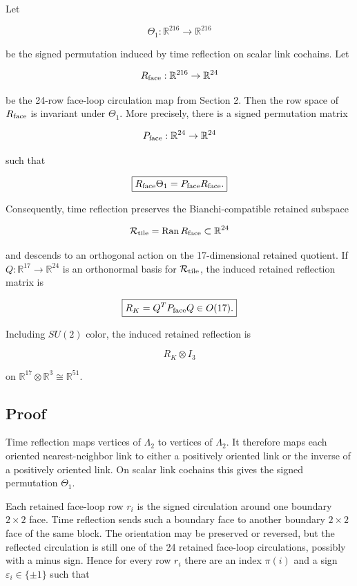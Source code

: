 \documentclass[10pt]{article}
\begin{document}
Let

\[
\Theta_1:\mathbb R^{216}\to\mathbb R^{216}
\]

be the signed permutation induced by time reflection on scalar link cochains.  Let

\[
R_{\rm face}:\mathbb R^{216}\to\mathbb R^{24}
\]

be the 24-row face-loop circulation map from Section 2.  Then the row space of \(R_{\rm face}\) is invariant under \(\Theta_1\).  More precisely, there is a signed permutation matrix

\[
P_{\rm face}:\mathbb R^{24}\to\mathbb R^{24}
\]

such that

\[
\boxed{
R_{\rm face}\Theta_1=P_{\rm face}R_{\rm face}.
}
\]

Consequently, time reflection preserves the Bianchi-compatible retained subspace

\[
\mathcal R_{\rm tile}=\operatorname{Ran}R_{\rm face}\subset\mathbb R^{24}
\]

and descends to an orthogonal action on the 17-dimensional retained quotient.  If \(Q:\mathbb R^{17}\to\mathbb R^{24}\) is an orthonormal basis for \(\mathcal R_{\rm tile}\), the induced retained reflection matrix is

\[
\boxed{
R_K=Q^TP_{\rm face}Q\in O(17).
}
\]

Including \(SU(2)\) color, the induced retained reflection is

\[
R_K\otimes I_3
\]

on \(\mathbb R^{17}\otimes\mathbb R^3\cong\mathbb R^{51}\).

\subsection{Proof}

Time reflection maps vertices of \(\Lambda_2\) to vertices of \(\Lambda_2\).  It therefore maps each oriented nearest-neighbor link to either a positively oriented link or the inverse of a positively oriented link.  On scalar link cochains this gives the signed permutation \(\Theta_1\).

Each retained face-loop row \(r_i\) is the signed circulation around one boundary \(2\times2\) face.  Time reflection sends such a boundary face to another boundary \(2\times2\) face of the same block.  The orientation may be preserved or reversed, but the reflected circulation is still one of the 24 retained face-loop circulations, possibly with a minus sign.  Hence for every row \(r_i\) there are an index \(\pi(i)\) and a sign \(\varepsilon_i\in\{\pm1\}\) such that
\end{document}
